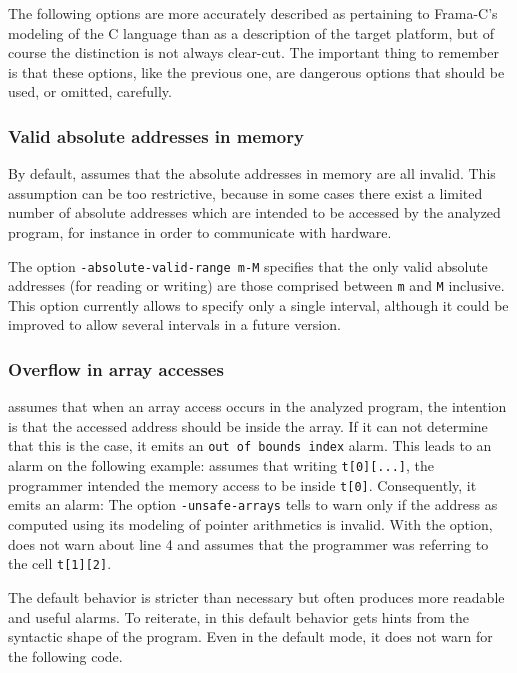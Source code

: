 \documentclass{frama-c-book}
\begin{document}
The following options are more accurately described as
pertaining to Frama-C's modeling of the C language
than as a description of the target platform, but of course
the distinction is not always clear-cut. The important thing to remember
is that these options, like the previous one, are dangerous options
that should be used, or omitted, carefully.

\subsubsection{Valid absolute addresses in memory}

By default, \Eva{} assumes that the absolute addresses in
memory are all invalid. This assumption can be too restrictive,
because in some cases there exist a limited number of absolute
addresses which are intended to be accessed by the analyzed program,
for instance in order to communicate with hardware.

The option \lstinline|-absolute-valid-range m-M|
specifies that the only valid absolute addresses (for reading or writing)
are those comprised between \lstinline$m$ and \lstinline$M$ inclusive.
This option currently allows to specify only a single interval,
although it could be improved to allow several intervals
in a future version.


\subsubsection{Overflow in array accesses}
\label{unsafe-arrays}

\Eva{} assumes that when an array
access occurs in the analyzed program, the intention is that the
accessed address should be inside the array. If it can not determine that
this is the case, it emits an \lstinline|out of bounds index|
alarm. This leads to an alarm on the following example:
\Eva{} assumes that writing \lstinline|t[0][...]|, the programmer
intended the memory access to be inside \lstinline|t[0]|. Consequently,
it emits an alarm:
The option \lstinline|-unsafe-arrays| tells \Eva{} to warn
only if the address as computed using its modeling of pointer arithmetics
is invalid. With the option, \Eva{} does not warn about line 4
and assumes that the programmer
was referring to the cell \lstinline|t[1][2]|.

The default behavior is stricter than necessary but often produces more
readable and useful alarms. To reiterate, in this default behavior
\Eva{} gets hints from the syntactic shape of the program.
Even in the default mode, it does not warn for the following code.
\begin{listing}{4}
  int *p=&t[0][12];
  return *p;
}
\end{listing}
\end{document}
